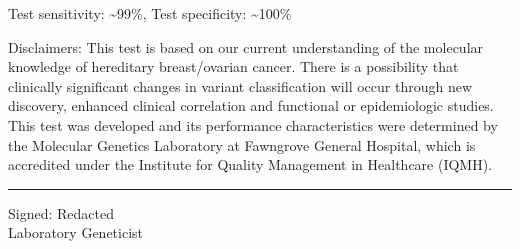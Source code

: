 \documentclass[10pt]{article}
\begin{document}
{Test sensitivity: \textasciitilde 99\%, Test specificity: \textasciitilde 100\%

Disclaimers:  This test is based on our current understanding of the molecular knowledge of hereditary breast/ovarian cancer. There is a possibility that clinically significant changes in variant classification will occur through new discovery, enhanced clinical correlation and functional or epidemiologic studies. This test was developed and its performance characteristics were determined by the Molecular Genetics Laboratory at Fawngrove General Hospital, which is accredited under the Institute for Quality Management in Healthcare (IQMH).
}

\vspace{4em}
\hfill \parbox{7cm}{
\rule{7cm}{1pt}
\small
Signed: Redacted \\
Laboratory Geneticist
}
\end{document}
